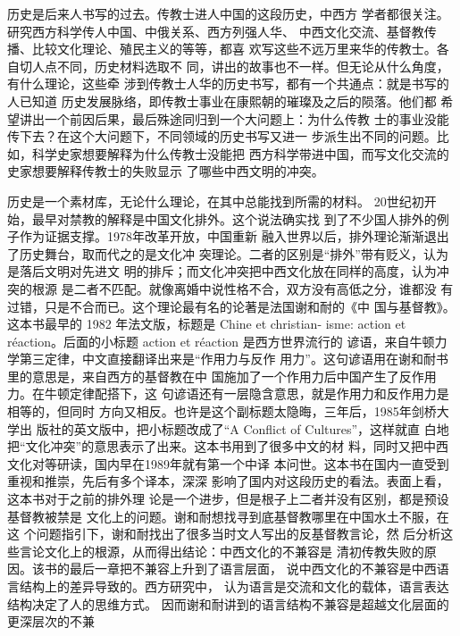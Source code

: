 \par
历史是后来人书写的过去。传教士进人中国的这段历史，中西方%
学者都很关注。研究西方科学传人中国、中俄关系、西方列强人华、%
中西文化交流、基督教传播、比较文化理论、殖民主义的等等，都喜%
欢写这些不远万里来华的传教士。各自切人点不同，历史材料选取不%
同，讲出的故事也不一样。但无论从什么角度，有什么理论，这些牵%
涉到传教士人华的历史书写，都有一个共通点：就是书写的人已知道%
历史发展脉络，即传教士事业在康熙朝的璀璨及之后的陨落。他们都%
希望讲出一个前因后果，最后殊途同归到一个大问题上：为什么传教%
士的事业没能传下去？在这个大问题下，不同领域的历史书写又进一%
步派生出不同的问题。比如，科学史家想要解释为什么传教士没能把%
西方科学带进中国，而写文化交流的史家想要解释传教士的失败显示%
了哪些中西文明的冲突。%
\par
历史是一个素材库，无论什么理论，在其中总能找到所需的材料。%
20世纪初开始，最早对禁教的解释是中国文化排外。这个说法确实找%
到了不少国人排外的例子作为证据支撑。1978年改革开放，中国重新%
融入世界以后，排外理论渐渐退出了历史舞台，取而代之的是文化冲%
突理论。二者的区别是“排外”带有贬义，认为是落后文明对先进文%
明的排斥；而文化冲突把中西文化放在同样的高度，认为冲突的根源%
是二者不匹配。就像离婚中说性格不合，双方没有高低之分，谁都没%
有过错，只是不合而已。这个理论最有名的论著是法国谢和耐的《中%
国与基督教》。这本书最早的 1982 年法文版，标题是 Chine et christian-%
isme: action et réaction。后面的小标题 action et réaction 是西方世界流行的%
谚语，来自牛顿力学第三定律，中文直接翻译出来是“作用力与反作%
用力”。这句谚语用在谢和耐书里的意思是，来自西方的基督教在中%
国施加了一个作用力后中国产生了反作用力。在牛顿定律配搭下，这%
句谚语还有一层隐含意思，就是作用力和反作用力是相等的，但同时%
方向又相反。也许是这个副标题太隐晦，三年后，1985年剑桥大学出%
版社的英文版中，把小标题改成了“A Conflict of Cultures”，这样就直%
白地把“文化冲突”的意思表示了出来。这本书用到了很多中文的材%
料，同时又把中西文化对等研读，国内早在1989年就有第一个中译%
本问世。这本书在国内一直受到重视和推崇，先后有多个译本，深深%
影响了国内对这段历史的看法。表面上看，这本书对于之前的排外理%
论是一个进步，但是根子上二者并没有区别，都是预设基督教被禁是%
文化上的问题。谢和耐想找寻到底基督教哪里在中国水土不服，在这%
个问题指引下，谢和耐找出了很多当时文人写出的反基督教言论，然%
后分析这些言论文化上的根源，从而得出结论：中西文化的不兼容是%
清初传教失败的原因。该书的最后一章把不兼容上升到了语言层面，%
说中西文化的不兼容是中西语言结构上的差异导致的。西方研究中，%
认为语言是交流和文化的载体，语言表达结构决定了人的思维方式。%
因而谢和耐讲到的语言结构不兼容是超越文化层面的更深层次的不兼%
